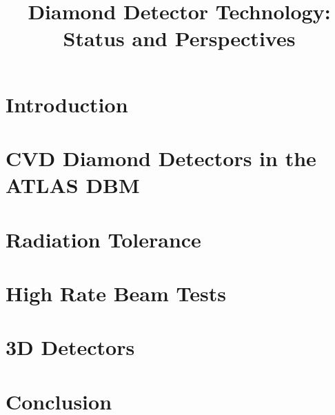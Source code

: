 \documentclass{PoS}
\title{Diamond Detector Technology: Status and Perspectives}
\begin{document}
\section{Introduction}


\section{\ac{CVD} Diamond Detectors in the ATLAS \ac{DBM}}


\section{Radiation Tolerance}\label{rad}


\section{High Rate Beam Tests}


\section{3D Detectors}\label{3D}


\section{Conclusion}




\newpage


\end{document}
